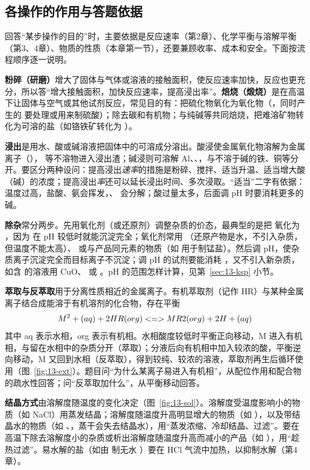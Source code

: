 \subsection{各操作的作用与答题依据}
回答“某步操作的目的”时，主要依据是反应速率（第2章）、化学平衡与溶解平衡（第3、4章）、物质的性质（本章第一节），还要兼顾收率、成本和安全。下面按流程顺序逐一说明。

\textbf{粉碎（研磨）}增大了固体与气体或溶液的接触面积，使反应速率加快，反应也更充分，所以答“增大接触面积，加快反应速率，提高浸出率”。\textbf{焙烧（煅烧）}是在高温下让固体与空气或其他试剂反应，常见目的有：把硫化物氧化为氧化物（，同时产生的  要处理或用来制硫酸）；除去碳和有机物；与纯碱等共同焙烧，把难溶矿物转化为可溶的盐（如铬铁矿转化为 ）。

\textbf{浸出}是用水、酸或碱溶液把固体中的可溶成分溶出。酸浸使金属氧化物溶解为金属离子（）， 等不溶物进入浸出渣；碱浸则可溶解 Al、、，与不溶于碱的铁、铜等分开。要区分两种设问：提高浸出\emph{速率}的措施是粉碎、搅拌、适当升温、适当增大酸（碱）的浓度；提高浸出\emph{率}还可以延长浸出时间、多次浸取。“适当”二字有依据：温度过高，盐酸、氨会挥发，、 会分解；酸过量太多，后面调 pH 时要消耗更多的碱。

\textbf{除杂}常分两步。先用氧化剂（或还原剂）调整杂质的价态，最典型的是把  氧化为 ，因为  在 pH 较低时就能沉淀完全；氧化剂常用 （还原产物是水，不引入杂质，但温度不能太高）、 或与产品同元素的物质（如  用于制锰盐）。然后调 pH，使杂质离子沉淀完全而目标离子不沉淀；调 pH 的试剂要能消耗 ，又不引入新杂质，如含  的溶液用 CuO、 或 。pH 的范围怎样计算，见第~\ref{sec:13-ksp} 小节。

\textbf{萃取与反萃取}用于分离性质相近的金属离子。有机萃取剂（记作 HR）与某种金属离子结合成能溶于有机溶剂的化合物，存在平衡
\[M^2+(aq) + 2HR(org) <=> MR2(org) + 2H+(aq)\]
其中 aq 表示水相，org 表示有机相。水相酸度较低时平衡正向移动，M 进入有机相，与留在水相中的杂质分开（萃取）；分液后向有机相中加入较浓的酸，平衡逆向移动，M 又回到水相（反萃取），得到较纯、较浓的溶液，萃取剂再生后循环使用（图~\ref{fig:13-ext}）。题目问“为什么某离子易进入有机相”，从配位作用和配合物的疏水性回答；问“反萃取加什么”，从平衡移动回答。

\textbf{结晶方式}由溶解度随温度的变化决定（图~\ref{fig:13-sol}）。溶解度受温度影响小的物质（如 NaCl）用蒸发结晶；溶解度随温度升高明显增大的物质（如 ），以及带结晶水的物质（如 、，蒸干会失去结晶水），用“蒸发浓缩、冷却结晶、过滤”。要在高温下除去溶解度小的杂质或析出溶解度随温度升高而减小的产品（如 ），用“趁热过滤”。易水解的盐（如由  制无水 ）要在 HCl 气流中加热，以抑制水解（第4章）。

